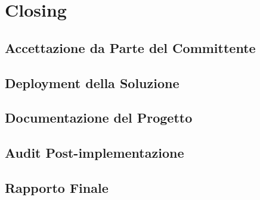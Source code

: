 \chapter{Closing}

\section{Accettazione da Parte del Committente}

\section{Deployment della Soluzione}

\section{Documentazione del Progetto}

\section{Audit Post-implementazione}

\section{Rapporto Finale}
